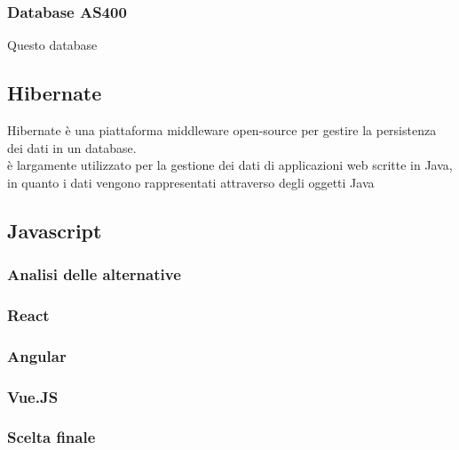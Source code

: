 \subsubsection{Database AS400}
Questo database %
\subsection{Hibernate}
Hibernate è una piattaforma \gls{middleware} open-source per gestire la persistenza dei dati in un database.\\
è largamente utilizzato per la gestione dei dati di applicazioni web scritte in Java, in quanto i dati vengono rappresentati attraverso degli oggetti Java
\subsection{Javascript}
\subsubsection{Analisi delle alternative}
\subsubsection{React}
\subsubsection{Angular}
\subsubsection{Vue.JS}
\subsubsection{Scelta finale}